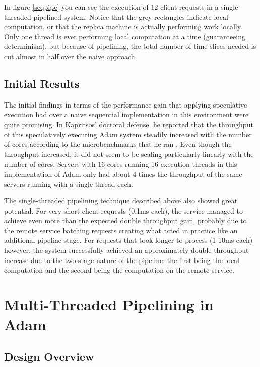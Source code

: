 \documentclass[11pt, oneside]{report}
\begin{document}
In figure \ref{seqpipe} you can see the execution of $12$ client requests in a single-threaded pipelined system. Notice that the grey rectangles indicate local computation, or that the replica machine is actually performing work locally. Only one thread is ever performing local computation at a time (guaranteeing determinism), but because of pipelining, the total number of time slices needed is cut almost in half over the naive approach.

\section{Initial Results}

The initial findings in terms of the performance gain that applying speculative execution had over a naive sequential implementation in this environment were quite promising. 
In Kapritsos' doctoral defense, he reported that the throughput of this speculatively executing Adam system steadily increased with the number of cores according to the microbenchmarks that he ran \cite{manosThesis}. 
Even though the throughput increased, it did not seem to be scaling particularly linearly with the number of cores. 
Servers with 16 cores running 16 execution threads in this implementation of Adam only had about 4 times the throughput of the same servers running with a single thread each.

The single-threaded pipelining technique described above also showed great potential. 
For very short client requests (0.1ms each), the service managed to achieve even more than the expected double throughput gain, probably due to the remote service batching requests creating what acted in practice like an additional pipeline stage. 
For requests that took longer to process (1-10ms each) however, the system successfully achieved an approximately double throughput increase due to the two stage nature of the pipeline: the first being the local computation and the second being the computation on the remote service.

\chapter{Multi-Threaded Pipelining in Adam}\label{AdamDesign}

\section{Design Overview}
\end{document}
